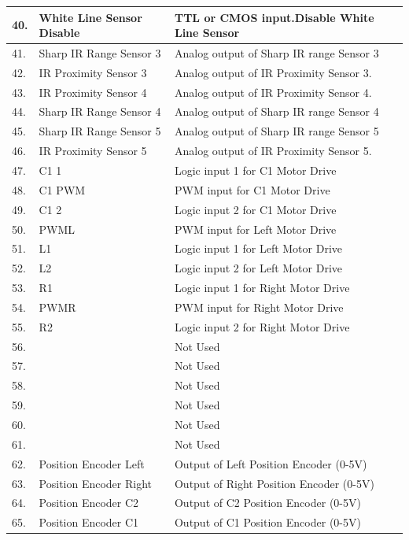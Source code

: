 \documentclass[a4paper,12pt,oneside]{book}
\begin{document}
\begin{tabular}{|p{2cm}|p{4cm}|p{10cm}|}
	\hline
40. & White Line Sensor Disable &TTL or CMOS input.Disable White Line Sensor\\
\hline
41. &Sharp IR Range Sensor 3 &Analog output of Sharp IR range Sensor 3 \\ 
\hline
42. &IR Proximity Sensor 3 &Analog output of IR Proximity Sensor 3. \\ 
\hline
43. &IR Proximity Sensor 4 &Analog output of IR Proximity Sensor 4. \\
\hline 
44. &Sharp IR Range Sensor 4 &Analog output of Sharp IR range Sensor 4 \\
\hline 
45. &Sharp IR Range Sensor 5 &Analog output of Sharp IR range Sensor 5 \\ 
\hline
46. &IR Proximity Sensor 5 &Analog output of IR Proximity Sensor 5. \\
\hline
47. & C1 1 & Logic input 1 for C1 Motor Drive\\
\hline
48. & C1 PWM & PWM input for C1 Motor Drive\\
\hline
49. & C1 2 & Logic input 2 for C1 Motor Drive\\
\hline
50. & PWML & PWM input for Left Motor Drive\\
\hline
51. & L1 & Logic input 1 for Left Motor Drive\\
\hline
52. & L2 & Logic input 2 for Left Motor Drive\\
\hline
53. & R1 & Logic input 1 for Right Motor Drive\\
\hline
54. & PWMR & PWM input for Right Motor Drive\\
\hline
55. & R2 & Logic input 2 for Right Motor Drive\\
\hline
56. & & Not Used\\
\hline
57. & & Not Used\\
\hline
58. & & Not Used\\
\hline
59. & & Not Used\\
\hline
60. & & Not Used\\
\hline
61. & & Not Used\\
\hline
62. &Position Encoder Left &Output of Left Position Encoder (0-5V)\\
\hline
63. &Position Encoder Right &Output of Right Position Encoder (0-5V)\\
\hline
64. &Position Encoder C2 &Output of C2 Position Encoder (0-5V)\\
\hline
65. &Position Encoder C1 &Output of C1 Position Encoder (0-5V)\\

\end{tabular}
\end{document}
